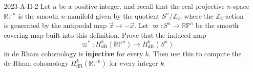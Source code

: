 \documentclass{article}
\begin{document}
	\begin{prb}{2023-A-II-2}
		Let $n$ be a positive integer, and recall that the real projective $n$-space $\mathbb{RP}^{n}$ is the smooth $n$-manifold given by the quotient $S^{n}/\mathbb{Z}_{2}$, where the $\mathbb{Z}_{2}$-action is generated by the antipodal map $\vec{x} \mapsto -\vec{x}$. Let $\varpi: S^{n} \to \mathbb{RP}^{n}$ be the smooth covering map built into this definition. Prove that the induced map 
		\begin{equation*}
			\varpi^{\ast}: H^{k}_{\text{dR}}(\mathbb{RP}^{n}) \to H^{k}_{\text{dR}}(S^{n})
		\end{equation*}
		in de Rham cohomology is \textbf{injective} for every $k$. Then use this to compute the de Rham cohomology $H^{k}_{\text{dR}}(\mathbb{RP}^{n})$ for every integer $k$. \label{prb:2023AII2}
	\end{prb}
\end{document}
